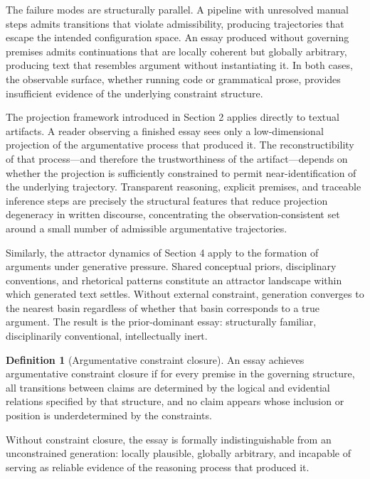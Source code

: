 \documentclass[12pt, oneside]{article}
\theoremstyle{plain}
\theoremstyle{definition}
\newtheorem{definition}[theorem]{Definition}
\theoremstyle{remark}
\begin{document}
The failure modes are structurally parallel. A pipeline with unresolved manual steps admits
transitions that violate admissibility, producing trajectories that escape the intended
configuration space. An essay produced without governing premises admits continuations that
are locally coherent but globally arbitrary, producing text that resembles argument without
instantiating it. In both cases, the observable surface, whether running code or grammatical
prose, provides insufficient evidence of the underlying constraint structure.

The projection framework introduced in Section 2 applies directly to textual artifacts.
A reader observing a finished essay sees only a low-dimensional projection of the
argumentative process that produced it. The reconstructibility of that process---and therefore
the trustworthiness of the artifact---depends on whether the projection is sufficiently
constrained to permit near-identification of the underlying trajectory. Transparent reasoning,
explicit premises, and traceable inference steps are precisely the structural features that
reduce projection degeneracy in written discourse, concentrating the observation-consistent
set around a small number of admissible argumentative trajectories.

Similarly, the attractor dynamics of Section 4 apply to the formation of arguments under
generative pressure. Shared conceptual priors, disciplinary conventions, and rhetorical
patterns constitute an attractor landscape within which generated text settles. Without
external constraint, generation converges to the nearest basin regardless of whether that
basin corresponds to a true argument. The result is the prior-dominant essay: structurally
familiar, disciplinarily conventional, intellectually inert.

\begin{definition}[Argumentative constraint closure]
An essay achieves argumentative constraint closure if for every premise in the governing
structure, all transitions between claims are determined by the logical and evidential
relations specified by that structure, and no claim appears whose inclusion or position
is underdetermined by the constraints.
\end{definition}

Without constraint closure, the essay is formally indistinguishable from an unconstrained
generation: locally plausible, globally arbitrary, and incapable of serving as reliable
evidence of the reasoning process that produced it.
\end{document}
